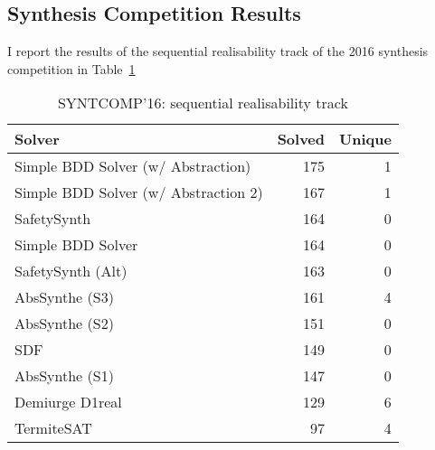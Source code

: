 \clearpage
\subsection{Synthesis Competition Results}

I report the results of the sequential realisability track of the 2016 synthesis competition in Table~\ref{table:syntcomp16s}

\begin{table}
    \centering
    \begin{tabular}{l r r}
        \textbf{Solver} & \textbf{Solved} & \textbf{Unique} \\
        \hline
        Simple BDD Solver (w/ Abstraction) & 175 & 1 \\
        Simple BDD Solver (w/ Abstraction 2) & 167 & 1 \\
        SafetySynth & 164 & 0 \\
        Simple BDD Solver & 164 & 0 \\
        SafetySynth (Alt) & 163 & 0 \\
        AbsSynthe (S3) & 161 & 4 \\
        AbsSynthe (S2) & 151 & 0 \\
        SDF & 149 & 0 \\
        AbsSynthe (S1) & 147 & 0 \\
        Demiurge D1real & 129 & 6 \\
        TermiteSAT & 97 & 4 \\
    \end{tabular}
    \caption{SYNTCOMP'16: sequential realisability track}
    \label{table:syntcomp16s}
\end{table}


